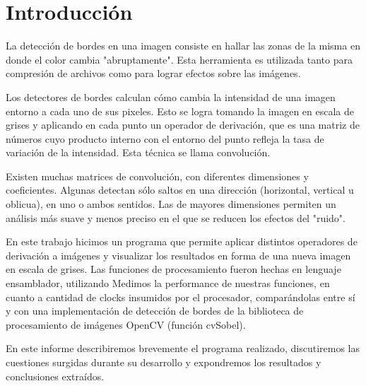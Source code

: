%

\section{Introducción}

La detección de bordes en una imagen consiste en hallar las zonas de la misma en donde el color cambia "abruptamente". Esta herramienta es utilizada tanto para compresión de archivos como para lograr efectos sobre las imágenes.

Los detectores de bordes calculan cómo cambia la intensidad de una imagen entorno a cada uno de sus pixeles. Esto se logra tomando la imagen en escala de grises y aplicando en cada punto un operador de derivación, que es una matriz de números cuyo producto interno con el entorno del punto refleja la tasa de variación de la intensidad. Esta técnica se llama convolución.

Existen muchas matrices de convolución, con diferentes dimensiones y coeficientes. Algunas detectan sólo saltos en una dirección (horizontal, vertical u oblicua), en uno o ambos sentidos. Las de mayores dimensiones permiten un análisis más suave y menos preciso en el que se reducen los efectos del "ruido".

En este trabajo hicimos un programa que permite aplicar distintos operadores de derivación a imágenes y visualizar los resultados en forma de una nueva imagen en escala de grises. Las funciones de procesamiento fueron hechas en lenguaje ensamblador, utilizando %
Medimos la performance de nuestras funciones, en cuanto a cantidad de clocks insumidos por el procesador, comparándolas entre sí y con una implementación de detección de bordes de la biblioteca de procesamiento de imágenes OpenCV (función cvSobel).

En este informe describiremos brevemente el programa realizado, discutiremos las cuestiones surgidas durante su desarrollo y expondremos los resultados y conclusiones extraídos.

